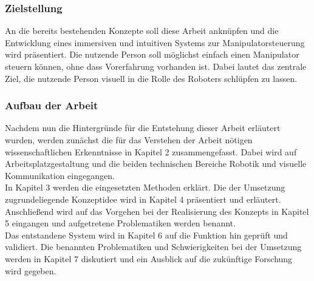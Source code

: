 \subsubsection{Zielstellung}%
  An die bereits bestehenden Konzepte soll diese Arbeit anknüpfen und die Entwicklung eines immersiven und intuitiven Systems zur Manipulatorsteuerung wird präsentiert. Die nutzende Person soll möglichst einfach einen Manipulator steuern können, ohne dass Vorerfahrung vorhanden ist. Dabei lautet das zentrale Ziel, die nutzende Person visuell in die Rolle des Roboters schlüpfen zu lassen.
\subsubsection{Aufbau der Arbeit}
  Nachdem nun die Hintergründe für die Entstehung dieser Arbeit erläutert wurden, werden zunächst die für das Verstehen der Arbeit nötigen wissenschaftlichen Erkenntnisse in Kapitel 2 zusammengefasst. Dabei wird auf Arbeitsplatzgestaltung und die beiden technischen Bereiche Robotik und visuelle Kommunikation eingegangen.\\
  In Kapitel 3 werden die eingesetzten Methoden erklärt. Die der Umsetzung zugrundeliegende Konzeptidee wird in Kapitel 4 präsentiert und erläutert.\\
  Anschließend wird auf das Vorgehen bei der Realisierung des Konzepts in Kapitel 5 eingangen und aufgetretene Problematiken werden benannt.\\
  Das entstandene System wird in Kapitel 6 auf die Funktion hin geprüft und validiert. Die benannten Problematiken und Schwierigkeiten bei der Umsetzung werden in Kapitel 7 diskutiert und ein Ausblick auf die zukünftige Forschung wird gegeben.\\
